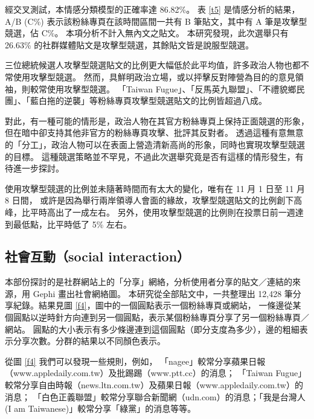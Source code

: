 \documentclass[a4paper, 10pt, conference]{ieeeconf}       %
\begin{document}
\begin{CJK}{UTF8}{bsmi}
經交叉測試，本情感分類模型的正確率達 86.82\%。%
表 \ref{t5} 是情感分析的結果，A/B (C\%) 表示該粉絲專頁在該時間區間一共有 B 筆貼文，其中有 A 筆是攻擊型競選，佔 C\%。%
本項分析不計入無內文之貼文。%
本研究發現，此次選舉只有 26.63\% 的社群媒體貼文是攻擊型競選，其餘貼文皆是說服型競選。%

三位總統候選人攻擊型競選貼文的比例更大幅低於此平均值，許多政治人物也都不常使用攻擊型競選。%
然而，具鮮明政治立場，或以抨擊反對陣營為目的的意見領袖，則較常使用攻擊型競選。%
「Taiwan Fugue」、「反馬英九聯盟」、「不禮貌鄉民團」、「藍白拖的逆襲」等粉絲專頁攻擊型競選貼文的比例皆超過八成。%

對此，有一種可能的情形是，政治人物在其官方粉絲專頁上保持正面競選的形象，但在暗中卻支持其他非官方的粉絲專頁攻擊、批評其反對者。%
透過這種有意無意的「分工」，政治人物可以在表面上營造清新高尚的形象，同時也實現攻擊型競選的目標。%
這種競選策略並不罕見，不過此次選舉究竟是否有這樣的情形發生，有待進一步探討。%

使用攻擊型競選的比例並未隨著時間而有太大的變化，唯有在 11 月 1 日至 11 月 8 日間，%
或許是因為舉行兩岸領導人會面的緣故，攻擊型競選貼文的比例創下高峰，比平時高出了一成左右。%
另外，使用攻擊型競選的比例則在投票日前一週達到最低點，比平時低了 5\% 左右。%

\subsection*{社會互動（social interaction）}

本部份探討的是社群網站上的「分享」網絡，分析使用者分享的貼文／連結的來源，用 Gephi 畫出社會網絡圖。%
本研究從全部貼文中，一共整理出 12,428 筆分享紀錄。結果見圖 \ref{f4}，圖中的一個圓點表示一個粉絲專頁或網站，%
一條邊從某個圓點以逆時針方向連到另一個圓點，表示某個粉絲專頁分享了另一個粉絲專頁／網站。%
圓點的大小表示有多少條邊連到這個圓點（即分支度為多少），邊的粗細表示分享次數。分群的結果以不同顏色表示。%

從圖 \ref{f4} 我們可以發現一些規則，例如，%
「nagee」較常分享蘋果日報（www.appledaily.com.tw）及批踢踢（www.ptt.cc）的消息；%
「Taiwan Fugue」較常分享自由時報（news.ltn.com.tw）及蘋果日報（www.appledaily.com.tw）的消息；%
「白色正義聯盟」較常分享聯合新聞網（udn.com）的消息；「我是台灣人 (I am Taiwanese)」較常分享「綠黨」的消息等等。%

\addtolength{\textheight}{-1.2cm} %


\end{CJK}
\end{document}
